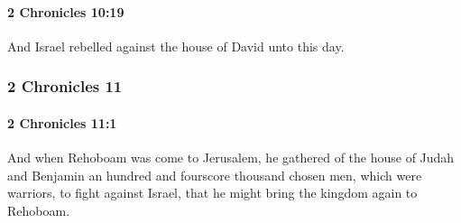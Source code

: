 		\paragraph{2 Chronicles 10:19} %
			\label{2CHRONICLES-10-19}

			And Israel rebelled against the house of David unto this day.

	\subsubsection{2 Chronicles 11} %
		\label{2CHRONICLES-11}

		\paragraph{2 Chronicles 11:1} %
			\label{2CHRONICLES-11-1}

			And when Rehoboam was come to Jerusalem, he gathered of the house of Judah and Benjamin an hundred and fourscore thousand chosen men, which were warriors, to fight against Israel, that he might bring the kingdom again to Rehoboam.

